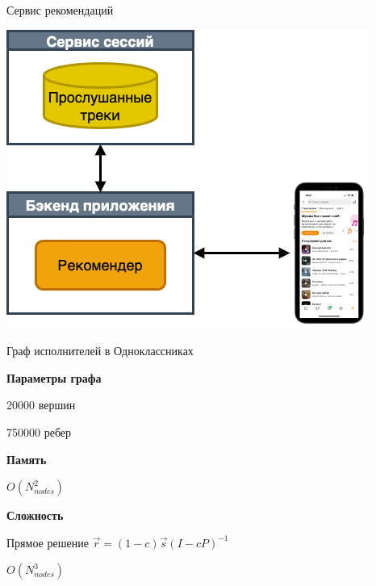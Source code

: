 \documentclass[11pt,aspectratio=169]{beamer}
\begin{document}
\begin{frame}{Сервис рекомендаций}

\begin{center}
\includegraphics[scale=0.35]{images/backend.png}
\end{center}

\end{frame}

{
\begin{frame}[plain]{Граф исполнителей в Одноклассниках}

{\bf Параметры графа}

20000 вершин

750000 ребер 

\pause

\vfill

{\bf Память}

\pause

$O(N_{nodes}^2)$

\vfill

{\bf Сложность}

Прямое решение $\vec{r} = (1 - c) \vec{s} \left(I - c P \right)^{-1}$

\pause

$O(N_{nodes}^3)$

\end{frame}
}
\end{document}
